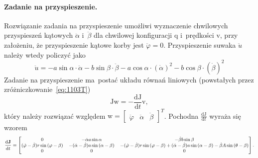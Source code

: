 \documentclass[paper=a4,DIV=12]{tmmlab}
\newcommand{\brm}[1]{\bm{\mathrm{#1}}}
\newcommand{\od}[2]{\frac{\mathrm{d}#1}{\mathrm{d}#2}}
\begin{document}
\begin{appendices}
  \paragraph{Zadanie na przyspieszenie.} Rozwiązanie zadania na przyspieszenie
  umożliwi wyznaczenie chwilowych przyspieszeń kątowych ${\ddot \alpha}$
  i~${\ddot \beta}$ dla chwilowej konfiguracji $\brm{q}$ i~prędkości
  $\brm{v}$, przy założeniu, że przyspieszenie kątowe korby jest ${\ddot
  \varphi} = 0$. Przyspieszenie suwaka ${\ddot u}$ należy wtedy policzyć jako
  \begin{equation}
    {\ddot u} = -a \sin{\alpha} \cdot {\ddot \alpha} - b \sin{\beta} \cdot {\ddot \beta}
                -a \cos{\alpha} \cdot {({\dot \alpha})}^2
                -b \cos{\beta}  \cdot {({\dot \beta})}^2
    \label{eq:XUEF2}
  \end{equation}
  Zadanie na przyspieszenie ma~postać układu równań liniowych (powstałych przez
  zróżniczkowanie~\eqref{eq:1103T})
  \begin{equation}
    \brm{J} \brm{w} = - \od{\brm{J}}{t} \brm{v},
    \label{eq:U49AH}
  \end{equation}
  który należy rozwiązać względem $\brm{w} = \begin{bmatrix} \ddot{\varphi}
  & \ddot{\alpha} & \ddot{\beta} \end{bmatrix}^T$. Pochodna $\od{\brm{J}}{t}$
  wyraża się wzorem
  \begin{equation}
    \footnotesize
    \od{\brm{J}}{t} = \begin{bmatrix}
       0 &
      -\dot{\alpha} a \sin{\alpha} &
      -\dot{\beta} b \sin{\beta}
      \\
       (\dot{\varphi}-\dot{\beta}) r \sin{(\varphi-\beta)} &
      -(\dot{\alpha}-\dot{\beta}) a \sin{(\alpha-\beta)} &
      -(\dot{\varphi}-\dot{\beta}) r \sin{(\varphi-\beta)}
        +(\dot{\alpha}-\dot{\beta}) a \sin{(\alpha-\beta)}
        - \dot{\beta} A\sin{(\theta-\beta)}
      \\
      0 & 0 & 0
    \end{bmatrix}.
    \label{eq:19DAI}
  \end{equation}


\end{appendices}
\end{document}
